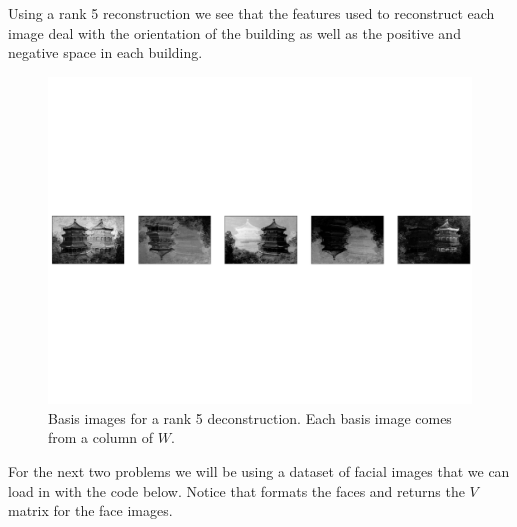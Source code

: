 Using a rank 5 reconstruction we see that the features used to reconstruct each image deal with the orientation of the building as well as the positive and negative space in each building.
\begin{figure}[H]
\centering
\includegraphics[width=\textwidth]{figures/building_basis_images.pdf}
\caption{Basis images for a rank 5 deconstruction.
	      Each basis image comes from a column of $W$.}
\label{fig:basis_building}
\end{figure}


For the next two problems we will be using a dataset of facial images that we can load in with the code below. Notice that  formats the faces and returns the $V$ matrix for the face images. 

